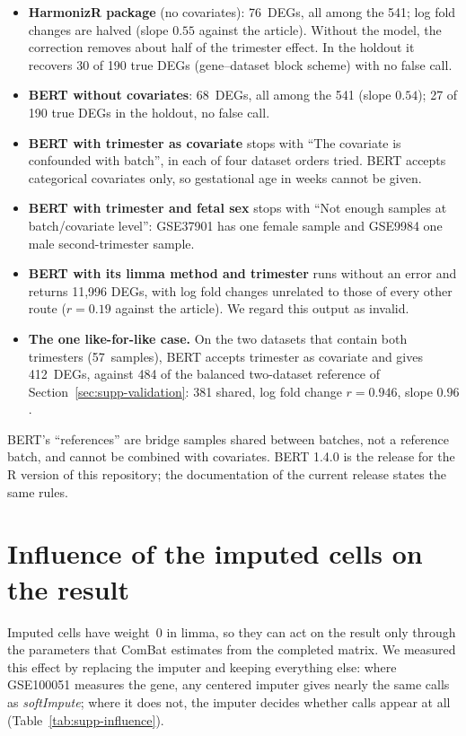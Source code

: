 \documentclass[11pt,a4paper]{article}
\begin{document}
\begin{itemize}
\item \textbf{HarmonizR package} (no covariates): 76~DEGs, all
  among the 541; log fold changes are halved (slope $0.55$ against
  the article). Without the model, the correction removes about
  half of the trimester effect. In the holdout it recovers 30 of
  190 true DEGs (gene--dataset block scheme) with no false call.
\item \textbf{BERT without covariates}: 68~DEGs, all among the 541
  (slope $0.54$); 27 of 190 true DEGs in the holdout, no false
  call.
\item \textbf{BERT with trimester as covariate} stops with ``The
  covariate is confounded with batch'', in each of four dataset
  orders tried. BERT accepts categorical covariates only, so
  gestational age in weeks cannot be given.
\item \textbf{BERT with trimester and fetal sex} stops with ``Not
  enough samples at batch/covariate level'': GSE37901 has one
  female sample and GSE9984 one male second-trimester sample.
\item \textbf{BERT with its limma method and trimester} runs
  without an error and returns 11{,}996 DEGs, with log fold
  changes unrelated to those of every other route ($r = 0.19$
  against the article). We regard this output as invalid.
\item \textbf{The one like-for-like case.} On the two datasets that
  contain both trimesters (57~samples), BERT accepts trimester as
  covariate and gives 412~DEGs, against 484 of the balanced
  two-dataset reference of Section~\ref{sec:supp-validation}: 381
  shared, log fold change $r = 0.946$, slope $0.96$.
\end{itemize}

BERT's ``references'' are bridge samples shared between batches,
not a reference batch, and cannot be combined with covariates.
BERT 1.4.0 is the release for the R version of this repository;
the documentation of the current release states the same rules.

\section{Influence of the imputed cells on the result}
\label{sec:supp-influence}

Imputed cells have weight~0 in limma, so they can act on the
result only through the parameters that ComBat estimates from the
completed matrix. We measured this effect by replacing the imputer
and keeping everything else: where GSE100051 measures the gene,
any centered imputer gives nearly the same calls as
\textit{softImpute}; where it does not, the imputer decides
whether calls appear at all (Table~\ref{tab:supp-influence}).
\end{document}
